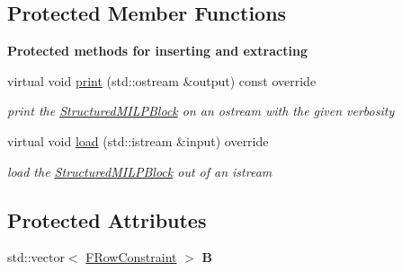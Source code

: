\subsection*{Protected Member Functions}
\begin{Indent}\textbf{ Protected methods for inserting and extracting}\par
\begin{DoxyCompactItemize}
\item 
\mbox{\label{class_s_m_spp__di__unipi__it_1_1_structured_m_i_l_p_block_a59a9fcbf8f9f86d348344b2073644b0e}} 
virtual void \mbox{\hyperlink{class_s_m_spp__di__unipi__it_1_1_structured_m_i_l_p_block_a59a9fcbf8f9f86d348344b2073644b0e}{print}} (std\+::ostream \&output) const override
\begin{DoxyCompactList}\small\item\em print the \mbox{\hyperlink{class_s_m_spp__di__unipi__it_1_1_structured_m_i_l_p_block}{Structured\+M\+I\+L\+P\+Block}} on an ostream with the given verbosity \end{DoxyCompactList}\item 
virtual void \mbox{\hyperlink{class_s_m_spp__di__unipi__it_1_1_structured_m_i_l_p_block_a019850055afe817b816bae5699f461d3}{load}} (std\+::istream \&input) override
\begin{DoxyCompactList}\small\item\em load the \mbox{\hyperlink{class_s_m_spp__di__unipi__it_1_1_structured_m_i_l_p_block}{Structured\+M\+I\+L\+P\+Block}} out of an istream \end{DoxyCompactList}\end{DoxyCompactItemize}
\end{Indent}
\subsection*{Protected Attributes}
\begin{DoxyCompactItemize}
\item 
\mbox{\label{class_s_m_spp__di__unipi__it_1_1_structured_m_i_l_p_block_add3906bbd195a0bfce160ee926fa081d}} 
std\+::vector$<$ \mbox{\hyperlink{class_s_m_spp__di__unipi__it_1_1_f_row_constraint}{F\+Row\+Constraint}} $>$ {\bfseries B}
\end{DoxyCompactItemize}
